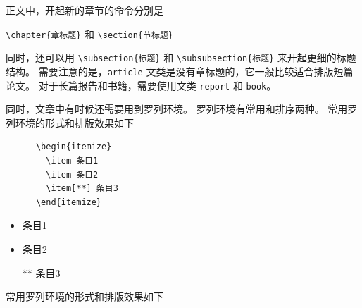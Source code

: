正文中，开起新的章节的命令分别是
\begin{center}
  \verb|\chapter{章标题}| 和 \verb|\section{节标题}|
\end{center}
同时，还可以用
\verb|\subsection{标题}| 和 \verb|\subsubsection{标题}|
来开起更细的标题结构。
需要注意的是，\texttt{article} 文类是没有章标题的，它一般比较适合排版短篇论文。
对于长篇报告和书籍，需要使用文类 \texttt{report} 和 \texttt{book}。

同时，文章中有时候还需要用到罗列环境。
罗列环境有常用和排序两种。
常用罗列环境的形式和排版效果如下

\vspace{1.2em}
\begin{minipage}{0.5\textwidth}
\small
\begin{verbatim}
      \begin{itemize}
        \item 条目1
        \item 条目2
        \item[**] 条目3
      \end{itemize}
\end{verbatim}
\end{minipage}\qquad\begin{minipage}{0.3\textwidth}
\begin{itemize}
  \item 条目1
  \item 条目2
  \item[**] 条目3
\end{itemize}
\end{minipage}

\vspace{1.2em}\noindent
常用罗列环境的形式和排版效果如下

